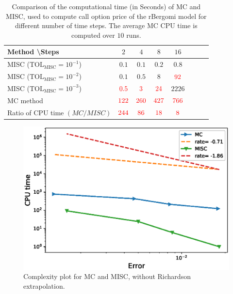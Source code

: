 \FloatBarrier
\begin{table}[h!]
	\centering
	\begin{tabular}{l*{6}{c}r}
		Method \textbackslash  Steps            & $2$ & $4$ & $8$ & $16$ &   \\
		\hline
		MISC ($\text{TOL}_{\text{MISC}}=10^{-1}$)  & $0.1$ & $0.1$ & $0.2$ & $0.8$ \\
		MISC ($\text{TOL}_{\text{MISC}}=10^{-2}$)  & $0.1$ & $0.5$ & $8$ & $\red{92}$ \\
		MISC ($\text{TOL}_{\text{MISC}}=10^{-3}$)  & $\red{0.5}$ & $\red{3}$ & $\red{24}$ & $2226$ \\
		\hline
		MC method   & $ \red{122}
		
		$  & $  \red{260}$  & $  \red{427}$ & $ \red{766}
		$  \\	
		\hline
		Ratio of CPU time  $\left(MC/MISC \right)$ & $ \red{244}
		
		$  & $  \red{86}$  & $  \red{  18
		}$ & $ \red{ 8}
		$  \\	
		
		\hline
	\end{tabular}
	\caption{Comparison of the computational time (in Seconds) of  MC and MISC, used to compute call option price of the rBergomi model for different number of time steps. The average  MC CPU time is computed over $10$ runs. }
	\label{Comparsion of the computational time of  MC and MISC, used to compute Call option price of rBergomi model for different number of time steps. Case set3}
\end{table}
\FloatBarrier
	\begin{figure}[h!]
	\centering
	\includegraphics[width=0.5\linewidth]{./figures/rBergomi_Complexity_rates/set5/error_vs_time_set5}

	\caption{Complexity plot for   MC and MISC, without Richardson extrapolation.}
	\label{fig:Complexity plot for MC and MISC for Case set $3$ parameters}
\end{figure}



